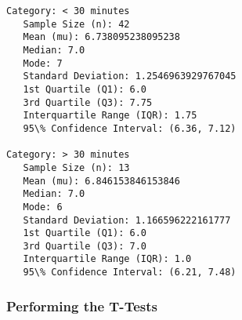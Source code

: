 \documentclass[11pt]{article}
\begin{document}
    \begin{Verbatim}[commandchars=\\\{\}]
Category: < 30 minutes
   Sample Size (n): 42
   Mean (mu): 6.738095238095238
   Median: 7.0
   Mode: 7
   Standard Deviation: 1.2546963929767045
   1st Quartile (Q1): 6.0
   3rd Quartile (Q3): 7.75
   Interquartile Range (IQR): 1.75
   95\% Confidence Interval: (6.36, 7.12)

Category: > 30 minutes
   Sample Size (n): 13
   Mean (mu): 6.846153846153846
   Median: 7.0
   Mode: 6
   Standard Deviation: 1.166596222161777
   1st Quartile (Q1): 6.0
   3rd Quartile (Q3): 7.0
   Interquartile Range (IQR): 1.0
   95\% Confidence Interval: (6.21, 7.48)

    \end{Verbatim}
\newpage
    \hypertarget{performing-the-t-tests}{%
\subsubsection{Performing the T-Tests}\label{performing-the-t-tests}}
\end{document}
